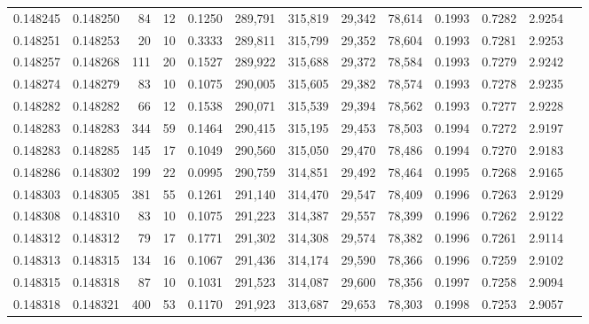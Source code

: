 \begin{tabular}{rrrrrrrrrrrrr}
0.148245 & 0.148250 &    84 &  12 &                                     0.1250 & 289,791 & 315,819 &  29,342 &  78,614 & 0.1993 & 0.7282 & 2.9254 \\
0.148251 & 0.148253 &    20 &  10 &                                     0.3333 & 289,811 & 315,799 &  29,352 &  78,604 & 0.1993 & 0.7281 & 2.9253 \\
0.148257 & 0.148268 &   111 &  20 &                                     0.1527 & 289,922 & 315,688 &  29,372 &  78,584 & 0.1993 & 0.7279 & 2.9242 \\
0.148274 & 0.148279 &    83 &  10 &                                     0.1075 & 290,005 & 315,605 &  29,382 &  78,574 & 0.1993 & 0.7278 & 2.9235 \\
0.148282 & 0.148282 &    66 &  12 &                                     0.1538 & 290,071 & 315,539 &  29,394 &  78,562 & 0.1993 & 0.7277 & 2.9228 \\
0.148283 & 0.148283 &   344 &  59 &                                     0.1464 & 290,415 & 315,195 &  29,453 &  78,503 & 0.1994 & 0.7272 & 2.9197 \\
0.148283 & 0.148285 &   145 &  17 &                                     0.1049 & 290,560 & 315,050 &  29,470 &  78,486 & 0.1994 & 0.7270 & 2.9183 \\
0.148286 & 0.148302 &   199 &  22 &                                     0.0995 & 290,759 & 314,851 &  29,492 &  78,464 & 0.1995 & 0.7268 & 2.9165 \\
0.148303 & 0.148305 &   381 &  55 &                                     0.1261 & 291,140 & 314,470 &  29,547 &  78,409 & 0.1996 & 0.7263 & 2.9129 \\
0.148308 & 0.148310 &    83 &  10 &                                     0.1075 & 291,223 & 314,387 &  29,557 &  78,399 & 0.1996 & 0.7262 & 2.9122 \\
0.148312 & 0.148312 &    79 &  17 &                                     0.1771 & 291,302 & 314,308 &  29,574 &  78,382 & 0.1996 & 0.7261 & 2.9114 \\
0.148313 & 0.148315 &   134 &  16 &                                     0.1067 & 291,436 & 314,174 &  29,590 &  78,366 & 0.1996 & 0.7259 & 2.9102 \\
0.148315 & 0.148318 &    87 &  10 &                                     0.1031 & 291,523 & 314,087 &  29,600 &  78,356 & 0.1997 & 0.7258 & 2.9094 \\
0.148318 & 0.148321 &   400 &  53 &                                     0.1170 & 291,923 & 313,687 &  29,653 &  78,303 & 0.1998 & 0.7253 & 2.9057 \\

\end{tabular}
